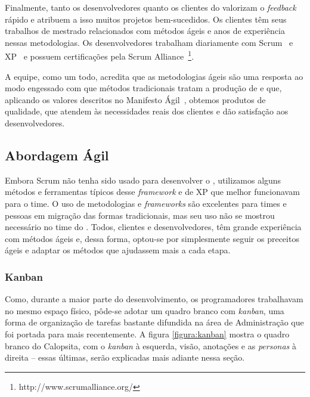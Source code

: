 Finalmente, tanto os desenvolvedores quanto os clientes do \calopsita{} valorizam o \textit{feedback} rápido e atribuem a isso muitos projetos bem-sucedidos. Os clientes têm seus trabalhos de mestrado relacionados com métodos ágeis e anos de experiência nessas metodologias. Os desenvolvedores trabalham diariamente com Scrum~\cite{scrum} e XP~\cite{xp} e possuem certificações pela Scrum Alliance~\footnote{http://www.scrumalliance.org/}. 

A equipe, como um todo, acredita que as metodologias ágeis são uma resposta ao modo engessado com que métodos tradicionais tratam a produção de \software{} e que, aplicando os valores descritos no Manifesto Ágil~\cite{manifesto}, obtemos produtos de qualidade, que atendem às necessidades reais dos clientes e dão satisfação aos desenvolvedores.  

\subsection{Abordagem Ágil}

Embora Scrum não tenha sido usado para desenvolver o \calopsita{}, utilizamos alguns métodos e ferramentas típicos desse
\textit{framework} e de XP que melhor funcionavam para o time. O uso de metodologias e \textit{frameworks} são excelentes para
times e pessoas em migração das formas tradicionais, mas seu uso não se mostrou necessário no time do \calopsita{}. Todos,
clientes e desenvolvedores, têm grande experiência com métodos ágeis e, dessa forma, optou-se por simplesmente seguir os
preceitos ágeis e adaptar os métodos que ajudassem mais a cada etapa. 

\subsubsection*{Kanban~\cite{kanban}}

Como, durante a maior parte do desenvolvimento, os programadores trabalhavam no mesmo espaço físico, pôde-se adotar um quadro branco com \textit{kanban}, uma forma de organização de tarefas bastante difundida na área de Administração que foi portada para \software{} mais recentemente. A figura \ref{figura:kanban} mostra o quadro branco do Calopsita, com o \textit{kanban} à esquerda, visão, anotações e as \textit{personas} à direita -- essas últimas, serão explicadas mais adiante nessa seção.

